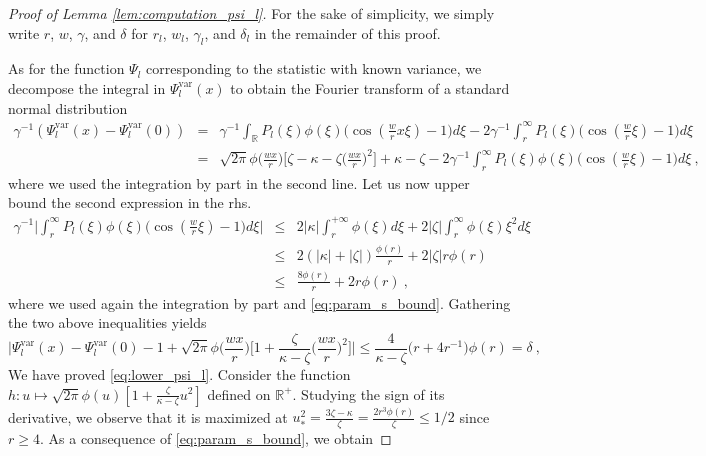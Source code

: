 \documentclass[twoside,11pt]{article}
\def\beqn{\begin{eqnarray*}}
\def\eeqn{\end{eqnarray*}}
\newcommand{\<}{\langle}
\renewcommand{\>}{\rangle}
\begin{document}
\begin{proof}[Proof of Lemma \ref{lem:computation_psi_l}]
 For the sake of simplicity, we simply write $r$, $w$, $\gamma$, and $\delta$ for $r_l$, $w_l$, $\gamma_l$, and $\delta_l$ in the remainder of this proof. 
 \begin{comment}
 Starting from
 \beqn 
 \int_{-r}^{r}\phi(t)dt &= &1 - 2\Phi(r)\\
 \int_{-r}^{r}t^2\phi(t)dt&=& -2r\phi(r) + \int_{-r}^{r}\phi(t)dt = -2r  \phi(r) + 1 - 2\Phi(r)\ , 
 \eeqn 
we derive that 
\beqn
\Psi^{\mathrm{var}}_l(0) &=& \gamma\Big[(\kappa - \zeta) (1-2\Phi(r))+ 2 \zeta r \phi(r)\Big]\\
&= &2\gamma\Big[(1-2\Phi(r))^2-r^3\phi(r) - 2r^2\phi^2(r)- r\phi(r)(1- 2\Phi(r)) \Big]= 1\ ,
\eeqn
by definition \eqref{eq:param_s} of $\gamma$, $\kappa$ and $\zeta$. Let us turn to the general expression of $\Psi^{\mathrm{var}}_l(x)$.
\end{comment}
As for the function $\Psi_l$ corresponding to the statistic with known variance, we decompose the integral in $\Psi^{\mathrm{var}}_l(x)$ to obtain the Fourier transform of a standard normal distribution
\beqn 
\gamma^{-1}(\Psi^{\mathrm{var}}_l(x)-\Psi^{\mathrm{var}}_l(0))&=& \gamma^{-1}\int_{\mathbb{R}}P_l(\xi)\phi(\xi)\big(\cos(\frac{w}{r}x\xi)-1)d\xi - 2 \gamma^{-1}\int_{r}^{\infty} P_l(\xi) \big(\cos(\frac{w}{r}\xi)-1\big)d\xi\\
& =& \sqrt{2\pi}\phi\big(\frac{wx}{r}\big)\Big[\zeta-\kappa  - \zeta\big( \frac{wx}{r}\big)^2\Big]+\kappa -\zeta - 2 \gamma^{-1}\int_{r}^{\infty} P_l(\xi)\phi(\xi)\big( \cos(\frac{w}{r}\xi)-1\big)d\xi\ ,
\eeqn 
where we used the integration by part in the second line. Let us now upper bound the second expression in the rhs. 
\beqn 
\gamma^{-1}\Big|\int_{r}^{\infty} P_l(\xi)\phi(\xi) \big( \cos(\frac{w}{r}\xi)-1\big)d\xi\Big|&\leq& 2|\kappa| \int_{r}^{+\infty} \phi(\xi) d\xi + 2|\zeta|\int_r^{\infty} \phi(\xi)\xi^2 d\xi \\
&\leq & 2(|\kappa|+ |\zeta|)\frac{\phi(r)}{r}+ 2|\zeta|r\phi(r)\\
&\leq& \frac{8\phi(r)}{r}+ 2r\phi(r)\ ,
\eeqn
where we used again the integration by part and \eqref{eq:param_s_bound}. Gathering the two above inequalities yields
\[
\Big|\Psi^{\mathrm{var}}_l(x)- \Psi^{\mathrm{var}}_l(0) - 1  + \sqrt{2\pi}\phi\big(\frac{wx}{r}\big)\big[1+ \frac{\zeta}{\kappa -\zeta }\big( \frac{wx}{r}\big)^2\big] \Big|\leq \frac{4}{\kappa -\zeta} \big( r+ 4r^{-1} \big) \phi(r) =\delta \ , 
\]
We have proved  \eqref{eq:lower_psi_l}. Consider the function $h:u\mapsto \sqrt{2\pi}\phi(u)[1+ \frac{\zeta}{\kappa -\zeta }u^2]$ defined on $\mathbb{R}^+$. Studying the sign of its derivative, we observe that it is maximized at $u_*^2=  \frac{3\zeta-\kappa}{\zeta}= \frac{2r^3\phi(r)}{\zeta}\leq 1/2$ since $r\geq 4$. As a consequence of \eqref{eq:param_s_bound}, we obtain

\end{proof}
\end{document}
